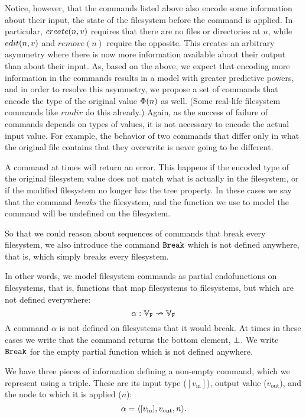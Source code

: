 Notice, however, that the commands listed above also encode some information about 
their input, the state of the filesystem
before the command is applied. In particular, $create(n,v)$ requires that there are no files
or directories at $n$, while $edit(n,v)$ and $remove(n)$ require the opposite.
This creates an arbitrary asymmetry where
there is now more information available about their output than about their input.
As, based on the above, we expect that encoding more information in the commands
results in a model with greater predictive powers,
and in order to resolve this asymmetry, 
we propose a set of commands that encode
the type of the original value $\Phi(n)$ as well.
(Some real-life filesystem commands like $rmdir$ do this already.)
Again, as the success of failure of commands depends on types of values,
it is not necessary to encode the actual input value.
For example, the behavior of two commands that differ only in what the original file contains
that they overwrite is never going to be different.

\bigskip


\noindent
A command at times will return an error.
This happens if the encoded type of the original filesystem value does not match
what is actually in the filesystem, or if the modified filesystem no
longer has the tree property.
In these cases we say that the command {\em breaks} the filesystem,
and the function we use to model the command will be undefined on the filesystem.

So that we could reason about sequences of commands that break every filesystem, 
we also introduce the command $\mathtt{Break}$ which is not defined anywhere,
that is, which simply breaks every filesystem.


\begin{mydef}
In other words, we model filesystem commands as partial endofunctions on filesystems,
that is, functions that map filesystems to filesystems, but which
are not defined everywhere:
\[ \alpha: \mathbb{V}_{\mathtt{F}} \nrightarrow \mathbb{V}_{\mathtt{F}} \]
A command $\alpha$ is not defined on filesystems that it would break.
At times in these cases we write that the command returns the bottom element, $\bot$.
We write $\mathtt{Break}$ for the empty partial function which is not defined anywhere.

We have three pieces of information defining a non-empty command,
which we represent using a triple. These are its
input type ($[v_\textrm{in}]$), output value ($v_\textrm{out}$),
and the node to which it is applied ($n$):
\[ \alpha = \langle{[v_\textrm{in}],v_\textrm{out},n}\rangle. \]
\end{mydef}

